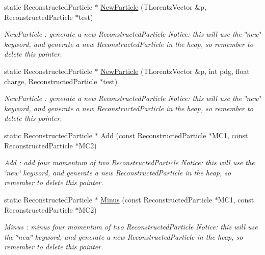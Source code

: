 \begin{DoxyCompactItemize}
static ReconstructedParticle $\ast$ \hyperlink{classToolSet_1_1CRC_ac054a2fae3815f1d4a24c781491f03b2}{NewParticle} (TLorentzVector \&p, ReconstructedParticle $\ast$test)
\begin{DoxyCompactList}\small\item\em NewParticle : generate a new ReconstructedParticle Notice: this will use the \char`\"{}new\char`\"{} keyword, and generate a new ReconstructedParticle in the heap, so remember to delete this pointer. \item\end{DoxyCompactList}\item 
static ReconstructedParticle $\ast$ \hyperlink{classToolSet_1_1CRC_adff0245c860e4ad9dc82c7bd95253455}{NewParticle} (TLorentzVector \&p, int pdg, float charge, ReconstructedParticle $\ast$test)
\begin{DoxyCompactList}\small\item\em NewParticle : generate a new ReconstructedParticle Notice: this will use the \char`\"{}new\char`\"{} keyword, and generate a new ReconstructedParticle in the heap, so remember to delete this pointer. \item\end{DoxyCompactList}\item 
static ReconstructedParticle $\ast$ \hyperlink{classToolSet_1_1CRC_abc862ca6ed2bb7b78c4ff26316253dec}{Add} (const ReconstructedParticle $\ast$MC1, const ReconstructedParticle $\ast$MC2)
\begin{DoxyCompactList}\small\item\em Add : add four momentum of two ReconstructedParticle Notice: this will use the \char`\"{}new\char`\"{} keyword, and generate a new ReconstructedParticle in the heap, so remember to delete this pointer. \item\end{DoxyCompactList}\item 
static ReconstructedParticle $\ast$ \hyperlink{classToolSet_1_1CRC_ac3a3e5e99a15fd8b409241d30f779663}{Minus} (const ReconstructedParticle $\ast$MC1, const ReconstructedParticle $\ast$MC2)
\begin{DoxyCompactList}\small\item\em Minus : minus four momentum of two ReconstructedParticle Notice: this will use the \char`\"{}new\char`\"{} keyword, and generate a new ReconstructedParticle in the heap, so remember to delete this pointer. \item\end{DoxyCompactList}\item 

\end{DoxyCompactItemize}
